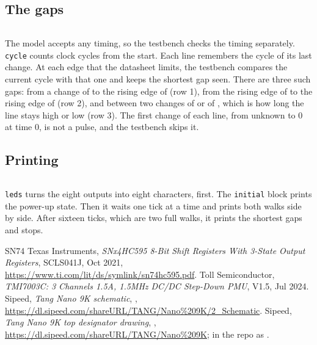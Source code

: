 \documentclass[11pt,a4paper]{article}
\begin{document}
\subsection*{The gaps}

\inputminted[firstline=62, lastline=85]{verilog}{../sim/walk_tb.v}

The model accepts any timing, so the testbench checks the timing separately. \texttt{cycle} counts clock cycles from the start. Each line remembers the cycle of its last change. At each edge that the datasheet limits, the testbench compares the current cycle with that one and keeps the shortest gap seen. There are three such gaps: from a change of  to the rising edge of  (row 1), from the rising edge of  to the rising edge of  (row 2), and between two changes of  or of , which is how long the line stays high or low (row 3). The first change of each line, from unknown to 0 at time 0, is not a pulse, and the testbench skips it.

\subsection*{Printing}

\inputminted[firstline=37, lastline=58]{verilog}{../sim/walk_tb.v}

\texttt{leds} turns the eight outputs into eight characters,  first. The \texttt{initial} block prints the power-up state. Then it waits one tick at a time and prints both walks side by side. After sixteen ticks, which are two full walks, it prints the shortest gaps and stops.

\begin{thebibliography}{SN74}
 Texas Instruments, \textit{SNx4HC595 8-Bit Shift Registers With 3-State Output Registers}, SCLS041J, Oct 2021, \url{https://www.ti.com/lit/ds/symlink/sn74hc595.pdf}.
 Toll Semiconductor, \textit{TMI7003C: 3 Channels 1.5A, 1.5MHz DC/DC Step-Down PMU}, V1.5, Jul 2024.
 Sipeed, \textit{Tang Nano 9K schematic}, , \url{https://dl.sipeed.com/shareURL/TANG/Nano%209K/2_Schematic}.
 Sipeed, \textit{Tang Nano 9K top designator drawing}, , \url{https://dl.sipeed.com/shareURL/TANG/Nano\%209K}; in the repo as .
\end{thebibliography}

\revisiontable
\end{document}
